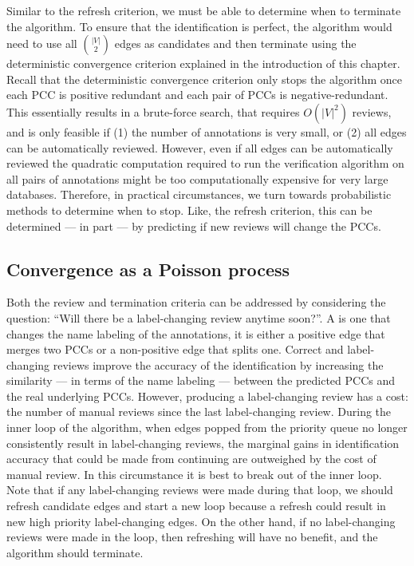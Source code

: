 Similar to the refresh criterion, we must be able to determine when to terminate the algorithm.
To ensure that the identification is perfect, the algorithm would need to use all $\binom{|V|}{2}$ edges as
  candidates and then terminate using the deterministic convergence criterion explained in the introduction of this
  chapter.
Recall that the deterministic convergence criterion only stops the algorithm once each PCC is positive redundant
  and each pair of PCCs is negative-redundant.
This essentially results in a brute-force search, that requires $O(|V|^2)$ reviews, and is only feasible if
(1) the number of annotations is very small, or
(2) all edges can be automatically reviewed.
However, even if all edges can be automatically reviewed the quadratic computation required to run the
  verification algorithm on all pairs of annotations might be too computationally expensive for very large
  databases.
Therefore, in practical circumstances, we turn towards probabilistic methods to determine when to stop.
Like, the refresh criterion, this can be determined --- in part --- by predicting if new reviews will change the
  PCCs.

\subsection{Convergence as a Poisson process}

\newcommand{\meaningful}{label-changing}

Both the review and termination criteria can be addressed by considering the question:
``Will there be a \meaningful{} review anytime soon?''.
A \glossterm{\meaningful{} review} is one that changes the name labeling of the annotations, \ie{} it is either a
  positive edge that merges two PCCs or a non-positive edge that splits one.
Correct and \meaningful{} reviews improve the accuracy of the identification by increasing the similarity --- in
  terms of the name labeling --- between the predicted PCCs and the real underlying PCCs.
However, producing a \meaningful{} review has a cost:
the number of manual reviews since the last \meaningful{} review.
During the inner loop of the algorithm, when edges popped from the priority queue no longer consistently result
  in \meaningful{} reviews, the marginal gains in identification accuracy that could be made from continuing are
  outweighed by the cost of manual review.
In this circumstance it is best to break out of the inner loop.
Note that if any \meaningful{} reviews were made during that loop, we should refresh candidate edges and start a
  new loop because a refresh could result in new high priority \meaningful{} edges.
On the other hand, if no \meaningful{} reviews were made in the loop, then refreshing will have no benefit, and
  the algorithm should terminate.


